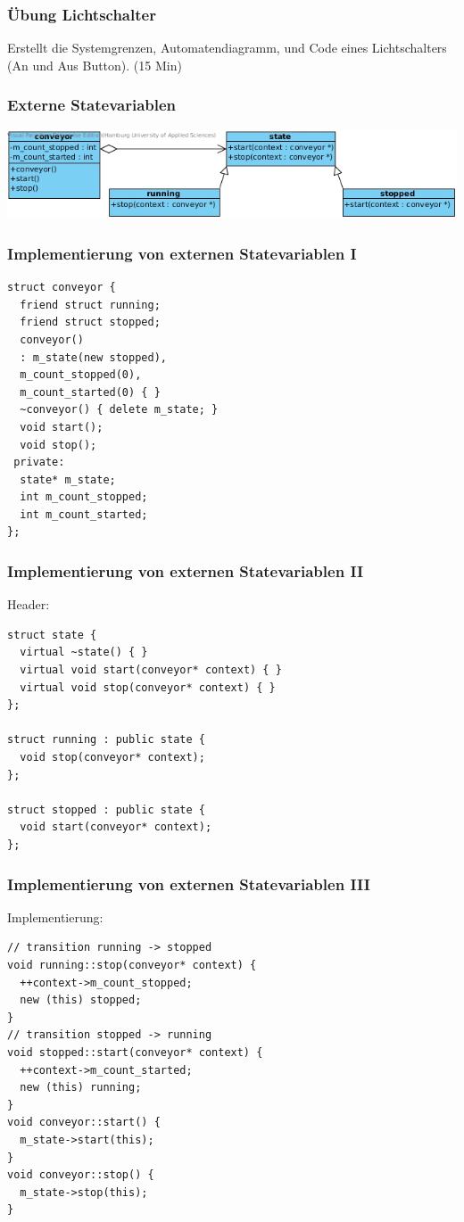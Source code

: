 \documentclass{beamer}
\begin{document}
\begin{frame}
 \frametitle{\"Ubung Lichtschalter}
 Erstellt die Systemgrenzen, Automatendiagramm, und Code eines Lichtschalters (An und Aus Button). (15 Min)
\end{frame}

\begin{frame}
 \frametitle{Externe Statevariablen}
  \includegraphics[scale=.44]{img/fsm_externe_state_var.jpg}
\end{frame}

\begin{frame}[fragile]
 \frametitle{Implementierung von externen Statevariablen I}
 \begin{lstlisting}
struct conveyor {
  friend struct running;
  friend struct stopped;
  conveyor()
  : m_state(new stopped),
  m_count_stopped(0),
  m_count_started(0) { }
  ~conveyor() { delete m_state; }
  void start();
  void stop();
 private:
  state* m_state;
  int m_count_stopped;
  int m_count_started;
};
\end{lstlisting}
\end{frame}

\begin{frame}[fragile]
  \frametitle{Implementierung von externen Statevariablen II}
  Header:
  \begin{lstlisting}
struct state {
  virtual ~state() { }
  virtual void start(conveyor* context) { }
  virtual void stop(conveyor* context) { }
};

struct running : public state {
  void stop(conveyor* context);
};

struct stopped : public state {
  void start(conveyor* context);
};
  \end{lstlisting}

\end{frame}

\begin{frame}[fragile]
  \frametitle{Implementierung von externen Statevariablen III}
  Implementierung:
  \begin{lstlisting}
// transition running -> stopped
void running::stop(conveyor* context) {
  ++context->m_count_stopped;
  new (this) stopped;
}
// transition stopped -> running
void stopped::start(conveyor* context) {
  ++context->m_count_started;
  new (this) running;
}
void conveyor::start() {
  m_state->start(this);
}
void conveyor::stop() {
  m_state->stop(this);
}
  \end{lstlisting}

\end{frame}
\end{document}
